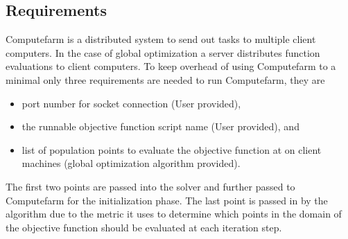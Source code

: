 \subsection{Requirements}
Computefarm is a distributed system to send out tasks to multiple client computers. In the case of global optimization a server distributes function evaluations to client computers. To keep overhead of using Computefarm to a minimal only three requirements are needed to run Computefarm, they are
\begin{itemize}
    \item port number for socket connection (User provided),
    \item the runnable objective function script name (User provided), and
    \item list of population points to evaluate the objective function at on client machines (global optimization algorithm provided).
\end{itemize}
The first two points are passed into the solver and further passed to Computefarm for the initialization phase. The last point is passed in by the algorithm due to the metric it uses to determine which points in the domain of the objective function should be evaluated at each iteration step.  
